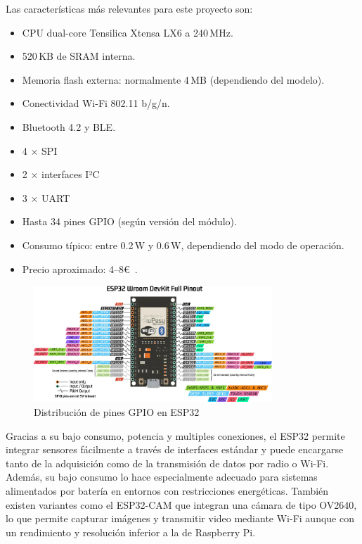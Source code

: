 \begin{itemize}
    Las características más relevantes para este proyecto son:
    \begin{itemize}
        \item CPU dual-core Tensilica Xtensa LX6 a 240\,MHz.
        \item 520\,KB de SRAM interna.
        \item Memoria flash externa: normalmente 4\,MB (dependiendo del modelo).
        \item Conectividad Wi-Fi 802.11 b/g/n.
        \item Bluetooth 4.2 y BLE.
        \item 4 × SPI
        \item 2 × interfaces I²C
        \item 3 × UART
        \item Hasta 34 pines GPIO (según versión del módulo).
        \item Consumo típico: entre 0.2\,W y 0.6\,W, dependiendo del modo de operación.
        \item Precio aproximado: 4–8€~\cite{esp32}.
    \end{itemize}
    \begin{figure}[h]
        \centering
        \includegraphics[width=0.8\textwidth]{Imagenes/Bitmap/esp32gpio}
        \caption{Distribución de pines GPIO en ESP32}
        \label{fig:esp32gpio}
    \end{figure}

    Gracias a su bajo consumo, potencia y multiples conexiones, el ESP32 permite integrar sensores fácilmente a través de interfaces estándar y puede encargarse tanto de la adquisición como de la transmisión de datos por radio o Wi-Fi.
    Además, su bajo consumo lo hace especialmente adecuado para sistemas alimentados por batería en entornos con restricciones energéticas.
    También existen variantes como el ESP32-CAM que integran una cámara de tipo OV2640, lo que permite capturar imágenes y transmitir video mediante Wi-Fi
    aunque con un rendimiento y resolución inferior a la de Raspberry Pi.


\end{itemize}

